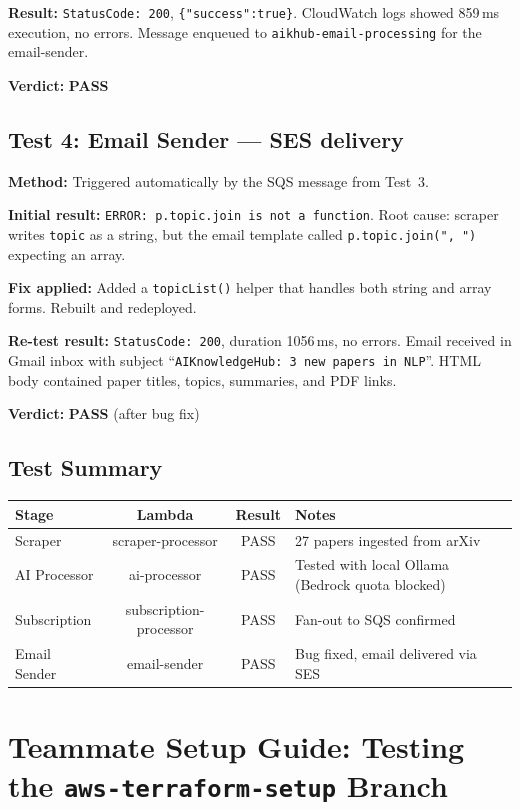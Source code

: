 \documentclass[11pt,a4paper]{article}
\begin{document}
\textbf{Result:} \texttt{StatusCode: 200}, \texttt{\{"success":true\}}. CloudWatch logs showed 859\,ms execution, no errors. Message enqueued to \texttt{aikhub-email-processing} for the email-sender.

\textbf{Verdict:} \textcolor{green!60!black}{\textbf{PASS}}

\subsection{Test 4: Email Sender --- SES delivery}

\textbf{Method:} Triggered automatically by the SQS message from Test~3.

\textbf{Initial result:} \texttt{ERROR: p.topic.join is not a function}. Root cause: scraper writes \texttt{topic} as a string, but the email template called \texttt{p.topic.join(", ")} expecting an array.

\textbf{Fix applied:} Added a \texttt{topicList()} helper that handles both string and array forms. Rebuilt and redeployed.

\textbf{Re-test result:} \texttt{StatusCode: 200}, duration 1056\,ms, no errors. Email received in Gmail inbox with subject ``\texttt{AIKnowledgeHub: 3 new papers in NLP}''. HTML body contained paper titles, topics, summaries, and PDF links.

\textbf{Verdict:} \textcolor{green!60!black}{\textbf{PASS}} (after bug fix)

\subsection{Test Summary}

\begin{tabularx}{\textwidth}{lccX}
\toprule
\textbf{Stage} & \textbf{Lambda} & \textbf{Result} & \textbf{Notes} \\
\midrule
Scraper          & scraper-processor       & PASS & 27 papers ingested from arXiv \\
AI Processor     & ai-processor            & PASS & Tested with local Ollama (Bedrock quota blocked) \\
Subscription     & subscription-processor  & PASS & Fan-out to SQS confirmed \\
Email Sender     & email-sender            & PASS & Bug fixed, email delivered via SES \\
\bottomrule
\end{tabularx}

\section{Teammate Setup Guide: Testing the \texttt{aws-terraform-setup} Branch}
\end{document}
